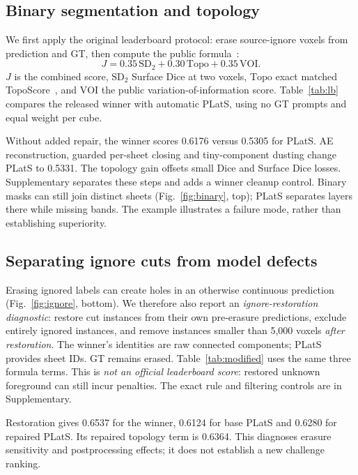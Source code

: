 \subsection{Binary segmentation and topology}
We first apply the original leaderboard protocol: erase source-ignore voxels
from prediction and GT, then compute the public formula~\cite{vesuviuseval}:
\begin{equation}
 J=0.35\,\mathrm{SD}_2+0.30\,\mathrm{Topo}+0.35\,\mathrm{VOI}.
 \label{eq:formula}
\end{equation}
$J$ is the combined score, $\mathrm{SD}_2$ Surface Dice at two voxels,
$\mathrm{Topo}$ exact matched TopoScore~\cite{stucki2022betti}, and
$\mathrm{VOI}$ the public variation-of-information score.
Table~\ref{tab:lb} compares the released winner with automatic PLatS,
using no GT prompts and equal weight per cube.



Without added repair, the winner scores 0.6176 versus 0.5305 for PLatS.
AE reconstruction, guarded per-sheet closing and tiny-component dusting change
PLatS to 0.5331. The topology gain offsets small Dice and Surface Dice losses.
Supplementary separates these steps and adds a winner
cleanup control. Binary masks can still join distinct sheets
(Fig.~\ref{fig:binary}, top); PLatS separates layers there while missing bands.
The example illustrates a failure mode, rather than establishing superiority.

\subsection{Separating ignore cuts from model defects}
Erasing ignored labels can create holes in an otherwise continuous prediction
(Fig.~\ref{fig:ignore}, bottom). We therefore also report an
\emph{ignore-restoration diagnostic}: restore cut instances from their own
pre-erasure predictions, exclude entirely ignored instances, and remove
instances smaller than 5,000 voxels \emph{after restoration}.
The winner's identities are raw connected components; PLatS provides sheet IDs.
GT remains erased. Table~\ref{tab:modified} uses the same three formula terms.
This is \emph{not an official leaderboard score}: restored unknown foreground
can still incur penalties. The exact rule and filtering controls are in
Supplementary.


Restoration gives 0.6537 for the winner, 0.6124 for base PLatS and
0.6280 for repaired PLatS. Its repaired topology term is 0.6364.
This diagnoses erasure sensitivity and postprocessing effects;
it does not establish a new challenge ranking.

